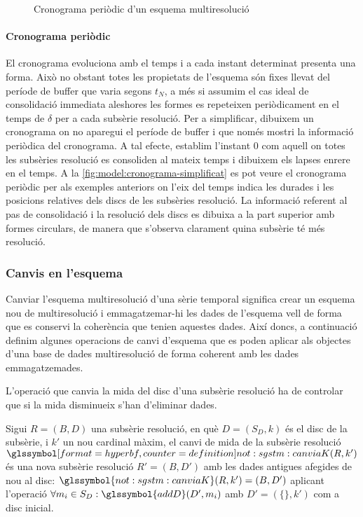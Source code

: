 \begin{figure}[tp]
  \centering
  
  \caption{Cronograma periòdic d'un esquema multiresolució}
  \label{fig:model:cronograma-simplificat}
\end{figure}


\paragraph{Cronograma periòdic}
El cronograma evoluciona amb el temps i a cada instant determinat
presenta una forma. Això no obstant totes les propietats de l'esquema
són fixes llevat del període de buffer que varia segons $t_N$, a més
si assumim el cas ideal de consolidació immediata aleshores les formes
es repeteixen periòdicament en el temps de $\delta$ per a cada
subsèrie resolució.  Per a simplificar, dibuixem un cronograma on no
aparegui el període de buffer i que només mostri la informació
periòdica del cronograma.  A tal efecte, establim l'instant 0 com
aquell on totes les subsèries resolució es consoliden al mateix temps
i dibuixem els lapses enrere en el temps. A la
\autoref{fig:model:cronograma-simplificat} es pot veure el cronograma
periòdic per als exemples anteriors on l'eix del temps  indica
les durades i les posicions relatives dels discs de les subsèries
resolució. La informació referent al pas de consolidació i la
resolució dels discs es dibuixa a la part superior amb formes
circulars, de manera que s'observa clarament quina subsèrie té més
resolució.




\subsubsection{Canvis en l'esquema}


Canviar l'esquema multiresolució d'una sèrie temporal significa crear
un esquema nou de multiresolució i emmagatzemar-hi les dades de
l'esquema vell de forma que es conservi la coherència que tenien
aquestes dades. Així doncs, a continuació definim algunes operacions
de canvi d'esquema que es poden aplicar als objectes d'una base de
dades multiresolució de forma coherent amb les dades emmagatzemades.


L'operació que canvia la mida del disc d'una subsèrie resolució ha de
controlar que si la mida disminueix s'han d'eliminar dades.
\begin{definition}
  Sigui $R=(B,D)$ una subsèrie resolució, en què $D=(S_D,k)$ és el
  disc de la subsèrie, i $k'$ un nou cardinal màxim, el canvi de mida
  de la subsèrie resolució $\glssymboldef{not:sgstm:canviaK}(R,k')$ és
  una nova subsèrie resolució $R'=(B,D')$ amb les dades antigues
  afegides de nou al disc: $\glssymbol{not:sgstm:canviaK}(R,k')=
  (B,D')$ aplicant l'operació $\forall m_i \in S_D:
  \glssymbol{addD}(D',m_i)$ amb $D'=(\{\},k')$ com a disc inicial.
\end{definition}



